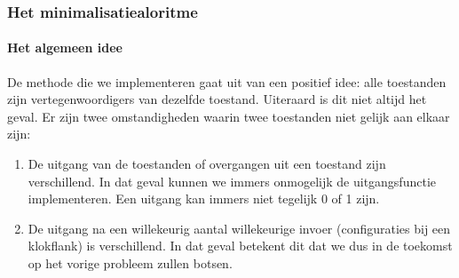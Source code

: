 \subsubsection{Het minimalisatiealoritme}
\paragraph{Het algemeen idee}De methode die we implementeren gaat uit van een positief idee: alle toestanden zijn vertegenwoordigers van dezelfde toestand. Uiteraard is dit niet altijd het geval. Er zijn twee omstandigheden waarin twee toestanden niet gelijk aan elkaar zijn:
\begin{enumerate}
 \item De uitgang van de toestanden of overgangen uit een toestand zijn verschillend. In dat geval kunnen we immers onmogelijk de uitgangsfunctie implementeren. Een uitgang kan immers niet tegelijk 0 of 1 zijn.
 \item De uitgang na een willekeurig aantal willekeurige invoer (configuraties bij een klokflank) is verschillend. In dat geval betekent dit dat we dus in de toekomst op het vorige probleem zullen botsen.
\end{enumerate}
